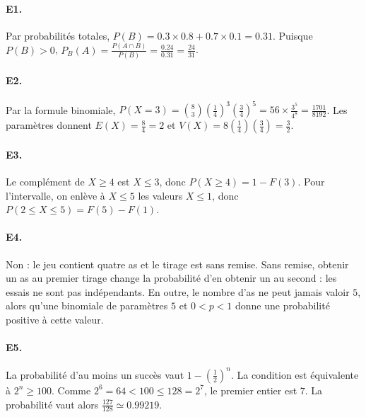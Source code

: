 \paragraph{E1.}Par probabilités totales, $P(B)=\num{0,3}\times\num{0,8}+\num{0,7}\times\num{0,1}=\num{0,31}$. Puisque $P(B)>0$, $P_B(A)=\frac{P(A\cap B)}{P(B)}=\frac{\num{0,24}}{\num{0,31}}=\frac{24}{31}$.

\paragraph{E2.}Par la formule binomiale, $P(X=3)=\binom{8}{3}(\frac{1}{4})^3(\frac{3}{4})^5=56\times\frac{3^5}{4^8}=\frac{1701}{8192}$. Les paramètres donnent $E(X)=\frac{8}{4}=2$ et $V(X)=8(\frac{1}{4})(\frac{3}{4})=\frac{3}{2}$.

\paragraph{E3.}Le complément de $X\ge4$ est $X\le3$, donc $P(X\ge4)=1-F(3)$. Pour l'intervalle, on enlève à $X\le5$ les valeurs $X\le1$, donc $P(2\le X\le5)=F(5)-F(1)$.

\paragraph{E4.}Non : le jeu contient quatre as et le tirage est sans remise. Sans remise, obtenir un as au premier tirage change la probabilité d'en obtenir un au second : les essais ne sont pas indépendants. En outre, le nombre d'as ne peut jamais valoir $5$, alors qu'une binomiale de paramètres $5$ et $0<p<1$ donne une probabilité positive à cette valeur.

\paragraph{E5.}La probabilité d'au moins un succès vaut $1-(\frac{1}{2})^n$. La condition est équivalente à $2^n\ge100$. Comme $2^6=64<100\le128=2^7$, le premier entier est $7$. La probabilité vaut alors $\frac{127}{128}\simeq\num{0,99219}$.

